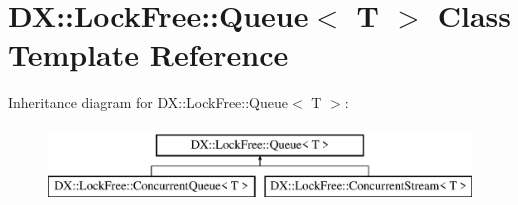 \hypertarget{class_d_x_1_1_lock_free_1_1_queue}{\section{D\-X\-:\-:Lock\-Free\-:\-:Queue$<$ T $>$ Class Template Reference}
\label{class_d_x_1_1_lock_free_1_1_queue}
}
Inheritance diagram for D\-X\-:\-:Lock\-Free\-:\-:Queue$<$ T $>$\-:\begin{figure}[H]
\begin{center}
\leavevmode
\includegraphics[height=2.000000cm]{class_d_x_1_1_lock_free_1_1_queue}
\end{center}
\end{figure}
